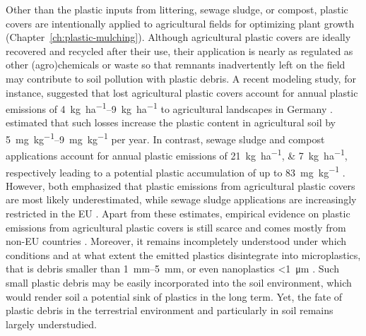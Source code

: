 Other than the plastic inputs from littering, sewage sludge, or compost, plastic covers are intentionally applied to agricultural fields for optimizing plant growth (Chapter~\ref{ch:plastic-mulching}).
Although agricultural plastic covers are ideally recovered and recycled after their use, their application is nearly as regulated as other (agro)chemicals \citep[REACH Regulation,][]{EuropeanParliamentRegulation2006} or waste \citep[Waste Framework Directive,][]{EuropeanParliamentDirective2008} so that remnants inadvertently left on the field may contribute to soil pollution with plastic debris.
A recent modeling study, for instance, suggested that lost agricultural plastic covers account for annual plastic emissions of \SIrange{4}{9}{\kilo\gram\per\hectare} to agricultural landscapes in Germany \citep{BertlingKunststoffe2021}.  estimated that such losses increase the plastic content in agricultural soil by \SIrange{5}{9}{\milli\gram\per\kilo\gram} per year. In contrast, sewage sludge and compost applications account for annual plastic emissions of \SIlist{21;7}{\kilo\gram\per\hectare}, respectively \citep{BertlingKunststoffe2021} leading to a potential plastic accumulation of up to \SI{83}{\milli\gram\per\kilo\gram} \citep{BrandesIdentifying2021}. However, both \citet{BertlingKunststoffe2021,BrandesIdentifying2021} emphasized that plastic emissions from agricultural plastic covers are most likely underestimated, while sewage sludge applications are increasingly restricted in the EU \citep{CollivignarelliLegislation2019}.
Apart from these estimates, empirical evidence on plastic emissions from agricultural plastic covers is still scarce and comes mostly from non-EU countries \citep{HuangAgricultural2020,ZhouMicroplastics2020}.
Moreover, it remains incompletely understood under which conditions and at what extent the emitted plastics disintegrate into microplastics, that is debris smaller than \SIrange{1}{5}{\milli\meter}, or even nanoplastics \SI{<1}{\micro\meter} \citep{HartmannAre2019}. Such small plastic debris may be easily incorporated into the soil environment, which would render soil a potential sink of plastics in the long term. Yet, the fate of plastic debris in the terrestrial environment and particularly in soil remains largely understudied.

